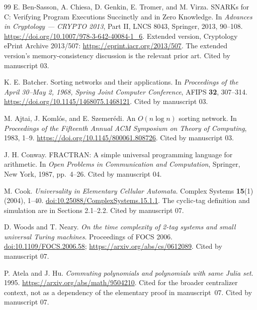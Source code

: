 \documentclass[11pt,a4paper]{article}
\theoremstyle{definition}
\theoremstyle{remark}
\begin{document}
\begin{thebibliography}{99}
E. Ben-Sasson, A. Chiesa, D. Genkin, E. Tromer, and M. Virza.
SNARKs for C: Verifying Program Executions Succinctly and in Zero Knowledge.
In \emph{Advances in Cryptology --- CRYPTO 2013}, Part II, LNCS 8043, Springer, 2013, 90--108.
\url{https://doi.org/10.1007/978-3-642-40084-1_6}.
Extended version, Cryptology ePrint Archive 2013/507: \url{https://eprint.iacr.org/2013/507}.
The extended version's memory-consistency discussion is the relevant prior art.
Cited by manuscript 03.

K. E. Batcher.
Sorting networks and their applications.
In \emph{Proceedings of the April 30--May 2, 1968, Spring Joint Computer Conference}, AFIPS \textbf{32}, 307--314.
\url{https://doi.org/10.1145/1468075.1468121}.
Cited by manuscript 03.

M. Ajtai, J. Koml\'os, and E. Szemer\'edi.
An $O(n\log n)$ sorting network.
In \emph{Proceedings of the Fifteenth Annual ACM Symposium on Theory of Computing}, 1983, 1--9.
\url{https://doi.org/10.1145/800061.808726}.
Cited by manuscript 03.

J. H. Conway.
FRACTRAN: A simple universal programming language for arithmetic.
In \emph{Open Problems in Communication and Computation}, Springer, New York, 1987, pp.~4--26.
Cited by manuscript 04.

M. Cook.
\emph{Universality in Elementary Cellular Automata}.
Complex Systems \textbf{15}(1) (2004), 1--40.
\href{https://doi.org/10.25088/ComplexSystems.15.1.1}{doi:10.25088/ComplexSystems.15.1.1}.
The cyclic-tag definition and simulation are in Sections 2.1--2.2.
Cited by manuscript 07.

D. Woods and T. Neary.
\emph{On the time complexity of 2-tag systems and small universal Turing machines}.
Proceedings of FOCS 2006.
\href{https://doi.org/10.1109/FOCS.2006.58}{doi:10.1109/FOCS.2006.58};
\url{https://arxiv.org/abs/cs/0612089}.
Cited by manuscript 07.

P. Atela and J. Hu.
\emph{Commuting polynomials and polynomials with same Julia set}.
1995. \url{https://arxiv.org/abs/math/9504210}.
Cited for the broader centralizer context, not as a dependency of the elementary proof in manuscript~07.
Cited by manuscript 07.
\end{thebibliography}
\end{document}
